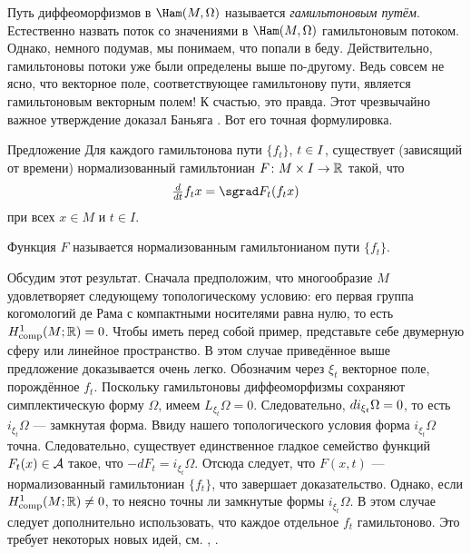 Путь диффеоморфизмов в $\Ham (M, \Omega)$ называется \emph{гамильтоновым путём}.
Естественно назвать поток со значениями в $\Ham (M, \Omega)$ гамильтоновым потоком.
Однако, немного подумав, мы понимаем, что попали в беду.
Действительно, гамильтоновы потоки уже были определены выше по-другому.
Ведь совсем не ясно, что векторное поле, соответствующее гамильтонову пути, является гамильтоновым векторным полем!
К счастью, это правда.
Этот чрезвычайно важное утверждение доказал Баньяга \cite{B1}.
Вот его точная формулировка.

\begin{thm}{Предложение}\label{1.4.B}
Для каждого гамильтонова пути $\{f_t\}$, $t \z\in I$, существует (зависящий от времени) нормализованный гамильтониан $F\colon M \times I \to \mathbb{R}$ такой, что 
\[\tfrac \d{\d t} f_t x = \sgrad F_t (f_t x)\]
при всех $x \in M$ и $t \in I$.
\end{thm}

Функция $F$ называется нормализованным гамильтонианом
пути $\{f_t\}$.

Обсудим этот результат.
Сначала предположим, что многообразие $M$ удовлетворяет следующему
топологическому условию: его первая группа когомологий де Рама с компактными носителями равна нулю, то есть $H_{\mathrm{comp}}^1(M;\mathbb{R}) = 0$.
Чтобы иметь перед собой пример, представьте себе двумерную сферу или линейное пространство.
В этом случае приведённое выше предложение доказывается очень легко.
Обозначим через $\xi_t$ векторное поле, порождённое $f_t$.
Поскольку гамильтоновы диффеоморфизмы сохраняют симплектическую форму $\Omega$, имеем $L_{\xi_t} \Omega = 0$.
Следовательно, $d i_{\xi_t} \Omega = 0$, то есть $i_{\xi_t} \Omega$ — замкнутая форма.
Ввиду нашего топологического условия форма $i_{\xi_t} \Omega$ точна.
Следовательно, существует единственное гладкое семейство функций $F_t (x) \in \mathcal{A}$ такое, что $-dF_t = i_{\xi_t} \Omega$.
Отсюда следует, что $F (x, t)$ — нормализованный гамильтониан $\{f_t\}$, что завершает доказательство.
Однако, если $H^1_{\mathrm{comp}} (M;\mathbb{R}) \ne 0$, то неясно точны ли замкнутые формы $i_{\xi_t} \Omega$.
В этом случае следует дополнительно использовать, что каждое отдельное $f_t$ гамильтоново.
Это требует некоторых новых идей, см. \cite{B1}, \cite{MS}.

